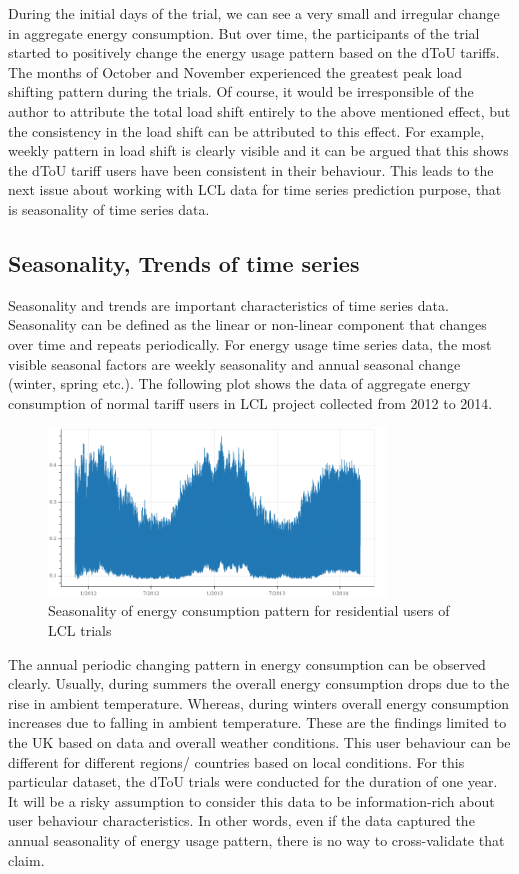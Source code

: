 During the initial days of the trial, we can see a very small and irregular change in aggregate energy consumption. But over time, the participants of the trial started to positively change the energy usage pattern based on the dToU tariffs. The months of October and November experienced the greatest peak load shifting pattern during the trials. Of course, it would be irresponsible of the author to attribute the total load shift entirely to the above mentioned effect,  but the consistency in the load shift can be attributed to this effect. For example, weekly pattern in load shift is clearly visible and it can be argued that this shows the dToU tariff users have been consistent in their behaviour. This leads to the next issue about working with LCL data for time series prediction purpose, that is seasonality of time series data.

\subsection{Seasonality, Trends of time series}

Seasonality and trends are important characteristics of time series data. Seasonality can be defined as the linear or non-linear component that changes over time and repeats periodically. For energy usage time series data, the most visible seasonal factors are weekly seasonality and annual seasonal change (winter, spring etc.). The following plot shows the data of aggregate energy consumption of normal tariff users in LCL project collected from 2012 to 2014.

\begin{figure}[h]
    \includegraphics[width=0.8\textwidth]{img/timeseries-seasonality.png}
    \centering
    \caption{Seasonality of energy consumption pattern for residential users of LCL trials}
    \label{fig:aviko-design}
\end{figure}

The annual periodic changing pattern in energy consumption can be observed clearly. Usually, during summers the overall energy consumption drops due to the rise in ambient temperature. Whereas, during winters overall energy consumption increases due to falling in ambient temperature. These are the findings limited to the UK based on data and overall weather conditions. This user behaviour can be different for different regions/ countries based on local conditions. For this particular dataset, the dToU trials were conducted for the duration of one year. It will be a risky assumption to consider this data to be information-rich about user behaviour characteristics. In other words, even if the data captured the annual seasonality of energy usage pattern, there is no way to cross-validate that claim.

